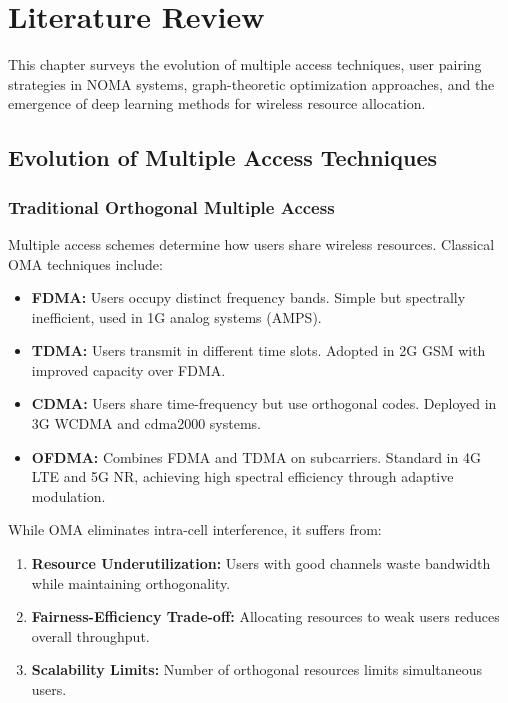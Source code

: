 \chapter{Literature Review}
\label{chap:literature}

This chapter surveys the evolution of multiple access techniques, user pairing strategies in NOMA systems, graph-theoretic optimization approaches, and the emergence of deep learning methods for wireless resource allocation.

\section{Evolution of Multiple Access Techniques}

\subsection{Traditional Orthogonal Multiple Access}

Multiple access schemes determine how users share wireless resources. Classical OMA techniques include:

\begin{itemize}
    \item \textbf{FDMA:} Users occupy distinct frequency bands. Simple but spectrally inefficient, used in 1G analog systems (AMPS).
    
    \item \textbf{TDMA:} Users transmit in different time slots. Adopted in 2G GSM with improved capacity over FDMA.
    
    \item \textbf{CDMA:} Users share time-frequency but use orthogonal codes. Deployed in 3G WCDMA and cdma2000 systems.
    
    \item \textbf{OFDMA:} Combines FDMA and TDMA on subcarriers. Standard in 4G LTE and 5G NR, achieving high spectral efficiency through adaptive modulation.
\end{itemize}

While OMA eliminates intra-cell interference, it suffers from:
\begin{enumerate}
    \item \textbf{Resource Underutilization:} Users with good channels waste bandwidth while maintaining orthogonality.
    \item \textbf{Fairness-Efficiency Trade-off:} Allocating resources to weak users reduces overall throughput.
    \item \textbf{Scalability Limits:} Number of orthogonal resources limits simultaneous users.
\end{enumerate}

